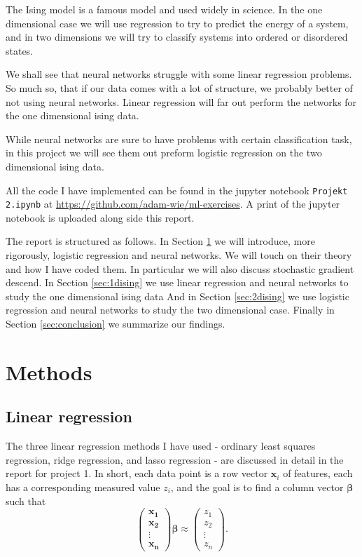 \documentclass[parskip=half]{scrartcl}
\theoremstyle{definition}
\theoremstyle{remark}
\newcommand{\vect}[1]{{\bm{#1}}}
\begin{document}
The Ising model is a famous model and used widely in science.
In the one dimensional case we will use regression to try to predict the energy of a system, and in two dimensions we will try to classify systems into ordered or disordered states.

We shall see that neural networks struggle with some linear regression problems. 
So much so, that if our data comes with a lot of structure, we probably better of not using neural networks.   
Linear regression will far out perform the networks for the one dimensional ising data. 

While neural networks are sure to have problems with certain classification task, in this project we will see them out preform logistic regression on the two dimensional ising data. 

\begin{framed}
All the code I have implemented can be found in the jupyter notebook \texttt{Projekt 2.ipynb} at \url{https://github.com/adam-wie/ml-exercises}.
A print of the jupyter notebook is uploaded along side this report.
\end{framed}

The report is structured as follows. 
In Section \ref{sec:methods} we will introduce, more rigorously, logistic regression and neural networks.
We will touch on their theory and how I have coded them.
In particular we will also discuss stochastic gradient descend. 
In Section \ref{sec:1dising} we use linear regression and neural networks to study the one dimensional ising data
And in Section \ref{sec:2dising} we use logistic regression and neural networks to study the two dimensional case. 
Finally in Section \ref{sec:conclusion} we summarize our findings.

\section{Methods} \label{sec:methods}
 
\subsection{Linear regression} \label{sec:linear} 

The three linear regression methods I have used - ordinary least squares regression, ridge regression, and lasso regression - are discussed in detail in the report for project 1.
In short, each data point is a row vector $\vect{x}_i$ of features, each has a corresponding measured value $z_i$, and the goal is to find a column vector $\vect{\beta}$ such that 
\[
	\begin{pmatrix}
		\vect{x_1} \\
		\vect{x_2} \\
		\vdots \\
		\vect{x_n}
	\end{pmatrix} \vect{\beta}
	\approx
	\begin{pmatrix} z_1 \\ z_2 \\ \vdots \\ z_n \end{pmatrix}.	
\] 
\end{document}
